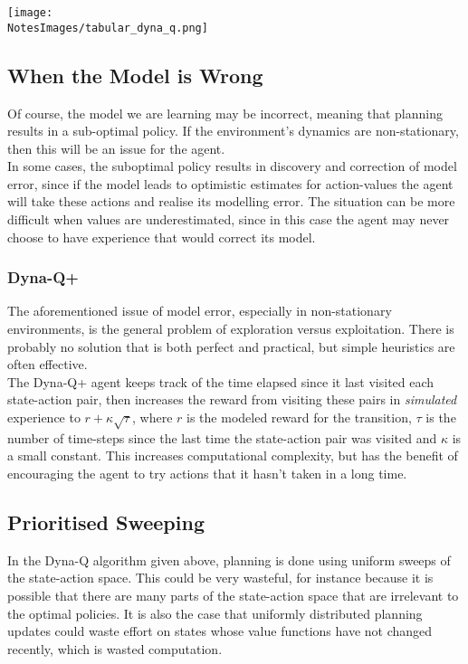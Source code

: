 \texttt{[image: \\NotesImages/tabular\_dyna\_q.png]}\\

\subsection{When the Model is Wrong}
Of course, the model we are learning may be incorrect, meaning that planning results in a sub-optimal policy. If the environment's dynamics are non-stationary, then this will be an issue for the agent. \\

In some cases, the suboptimal policy results in discovery and correction of model error, since if the model leads to optimistic estimates for action-values the agent will take these actions and realise its modelling error. The situation can be more difficult when values are underestimated, since in this case the agent may never choose to have experience that would correct its model.\\

\subsubsection*{Dyna-Q+}
The aforementioned issue of model error, especially in non-stationary environments, is the general problem of exploration versus exploitation. There is probably no solution that is both perfect and practical, but simple heuristics are often effective.\\

The Dyna-Q+ agent keeps track of the time elapsed since it last visited each state-action pair, then increases the reward from visiting these pairs in \emph{simulated} experience to $r + \kappa \sqrt{\tau}$, where $r$ is the modeled reward for the transition, $\tau$ is the number of time-steps since the last time the state-action pair was visited and $\kappa$ is a small constant. This increases computational complexity, but has the benefit of encouraging the agent to try actions that it hasn't taken in a long time.

\subsection{Prioritised Sweeping}
In the Dyna-Q algorithm given above, planning is done using uniform sweeps of the state-action space. This could be very wasteful, for instance because it is possible that there are many parts of the state-action space that are irrelevant to the optimal policies. It is also the case that uniformly distributed planning updates could waste effort on states whose value functions have not changed recently, which is wasted computation. \\

